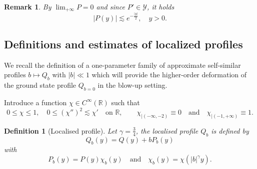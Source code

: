 \documentclass[16pt,english, oneside,reqno]{smfart}
\newcommand{\RR}{\mathbb{R}}
\newtheorem{definition}{Definition}[section]
\newtheorem{remark}{Remark}[section]
\begin{document}
\begin{remark}
    By $\lim_{+\infty}P=0$ and since $P' \in \mathcal{Y}$, it holds
    \begin{equation}\label{property_on_right_on_P}
       | P(y)| \lesssim e^{-\frac{|y|}{2}}, \quad y>0.
    \end{equation}
\end{remark}


\subsection{Definitions and estimates of localized profiles}
We recall the definition of a one-parameter family of approximate self-similar profiles $b \mapsto Q_b$ with $|b|\ll 1$ which will provide the higher-order deformation of the ground state profile $Q_{b=0}$ in the blow-up setting. 

Introduce a function $\chi \in C^{\infty}(\RR)$ such that
\begin{equation}
    0\leq \chi\leq 1, \quad 0\leq (\chi'')^2 \lesssim \chi' \quad \text{on }\RR, \qquad \chi_{|(-\infty,-2)} \equiv 0 \quad \text{and} \quad \chi_{|(-1,+\infty)} \equiv 1.
\end{equation}

\begin{definition}[Localised profile]
    Let $\gamma = \frac{3}{4}$, the localised profile $Q_b$ is defined by
    \begin{equation}
        Q_b(y) = Q(y) + bP_b(y)
    \end{equation}
    with 
    \begin{equation}
        P_b(y) = P(y) \chi_b(y) \quad \text{and} \quad \chi_b(y) = \chi(|b|^{\gamma}y).
    \end{equation}
\end{definition}
\end{document}
